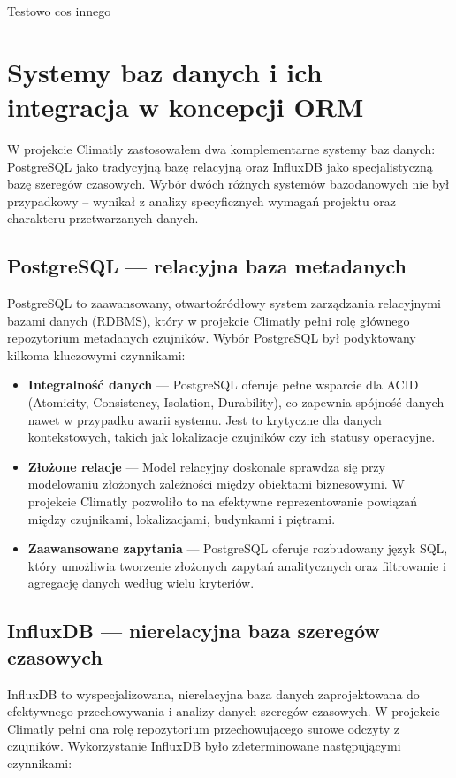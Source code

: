 \documentclass[a4paper,12pt,openany]{book}
\begin{document}
Testowo cos innego

\section{Systemy baz danych i ich integracja w koncepcji ORM}
W projekcie Climatly zastosowałem dwa komplementarne systemy baz danych: PostgreSQL jako tradycyjną bazę relacyjną oraz InfluxDB jako specjalistyczną bazę szeregów czasowych. Wybór dwóch różnych systemów bazodanowych nie był przypadkowy – wynikał z analizy specyficznych wymagań projektu oraz charakteru przetwarzanych danych.
\subsection*{PostgreSQL --- relacyjna baza metadanych}
PostgreSQL to zaawansowany, otwartoźródłowy system zarządzania relacyjnymi bazami danych (RDBMS), który w projekcie Climatly pełni rolę głównego repozytorium metadanych czujników. Wybór PostgreSQL był podyktowany kilkoma kluczowymi czynnikami:

\begin{itemize}
  \item \textbf{Integralność danych} --- PostgreSQL oferuje pełne wsparcie dla ACID (Atomicity, Consistency, Isolation, Durability), co zapewnia spójność danych nawet w przypadku awarii systemu. Jest to krytyczne dla danych kontekstowych, takich jak lokalizacje czujników czy ich statusy operacyjne.
  \item \textbf{Złożone relacje} --- Model relacyjny doskonale sprawdza się przy modelowaniu złożonych zależności między obiektami biznesowymi. W projekcie Climatly pozwoliło to na efektywne reprezentowanie powiązań między czujnikami, lokalizacjami, budynkami i piętrami.
  \item \textbf{Zaawansowane zapytania} --- PostgreSQL oferuje rozbudowany język SQL, który umożliwia tworzenie złożonych zapytań analitycznych oraz filtrowanie i agregację danych według wielu kryteriów.
\end{itemize}

\subsection*{InfluxDB --- nierelacyjna baza szeregów czasowych}
InfluxDB to wyspecjalizowana, nierelacyjna baza danych zaprojektowana do efektywnego przechowywania i analizy danych szeregów czasowych. W projekcie Climatly pełni ona rolę repozytorium przechowującego surowe odczyty z czujników. Wykorzystanie InfluxDB było zdeterminowane następującymi czynnikami:
\end{document}
